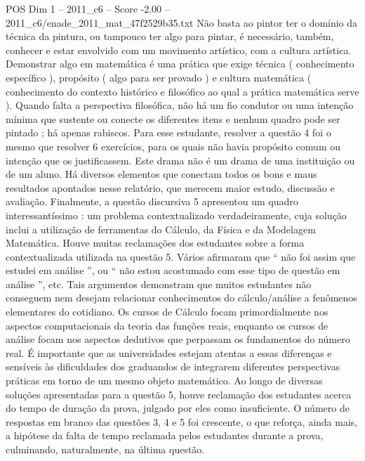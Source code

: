 \begin{textsample}{POS Dim 1 – 2011\_c6 – Score -2.00 – 2011\_c6/enade\_2011\_mat\_47f2529b35.txt}
Não basta ao pintor ter o domínio da técnica da pintura, ou tampouco ter algo para pintar, é necessário, também, conhecer e estar envolvido com um movimento artístico, com a cultura artística.
Demonstrar algo em matemática é uma prática que exige técnica ( conhecimento específico ), propósito ( algo para ser provado ) e cultura matemática ( conhecimento do contexto histórico e filosófico ao qual a prática matemática serve ).
Quando falta a perspectiva filosófica, não há um fio condutor ou uma intenção mínima que sustente ou conecte os diferentes itens e nenhum quadro pode ser pintado ; há apenas rabiscos.
Para esse estudante, resolver a questão 4 foi o mesmo que resolver 6 exercícios, para os quais não havia propósito comum ou intenção que os justificassem.
Este drama não é um drama de uma instituição ou de um aluno.
Há diversos elementos que conectam todos os bons e maus resultados apontados nesse relatório, que merecem maior estudo, discussão e avaliação.
Finalmente, a questão discursiva 5 apresentou um quadro interessantíssimo : um problema contextualizado verdadeiramente, cuja solução inclui a utilização de ferramentas do Cálculo, da Física e da Modelagem Matemática.
Houve muitas reclamações dos estudantes sobre a forma contextualizada utilizada na questão 5.
Vários afirmaram que “ não foi assim que estudei em análise ”, ou “ não estou acostumado com esse tipo de questão em análise ”, etc.
Tais argumentos demonstram que muitos estudantes não conseguem nem desejam relacionar conhecimentos do cálculo/análise a fenômenos elementares do cotidiano.
Os cursos de Cálculo focam primordialmente nos aspectos computacionais da teoria das funções reais, enquanto os cursos de análise focam nos aspectos dedutivos que perpassam os fundamentos do número real.
É importante que as universidades estejam atentas a essas diferenças e sensíveis às dificuldades dos graduandos de integrarem diferentes perspectivas práticas em torno de um mesmo objeto matemático.
Ao longo de diversas soluções apresentadas para a questão 5, houve reclamação dos estudantes acerca do tempo de duração da prova, julgado por eles como insuficiente.
O número de respostas em branco das questões 3, 4 e 5 foi crescente, o que reforça, ainda mais, a hipótese da falta de tempo reclamada pelos estudantes durante a prova, culminando, naturalmente, na última questão.

\end{textsample}

